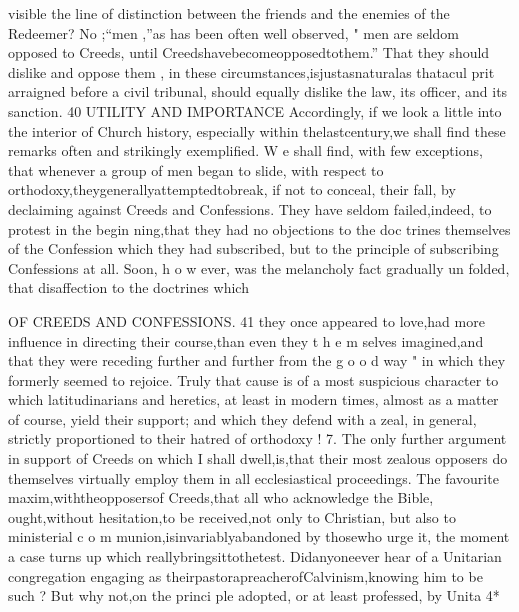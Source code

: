 \documentclass[
]{book}
\begin{document}
visible the line of distinction between the friends and the enemies of the Redeemer? No ;``men ,''as has been often well observed, " men are seldom opposed to Creeds, until Creedshavebecomeopposedtothem.'' That they should dislike and oppose them , in these
circumstances,isjustasnaturalas thatacul prit arraigned before a civil tribunal, should equally dislike the law, its officer, and its sanction.
40 UTILITY AND IMPORTANCE
Accordingly, if we look a little into the interior of Church history, especially within thelastcentury,we shall find these remarks
often and strikingly exemplified. W e shall find, with few exceptions, that whenever a group of men began to slide, with respect to orthodoxy,theygenerallyattemptedtobreak, if not to conceal, their fall, by declaiming against Creeds and Confessions. They have
seldom failed,indeed, to protest in the begin ning,that they had no objections to the doc trines themselves of the Confession which
they had subscribed, but to the principle of subscribing Confessions at all. Soon, h o w ever, was the melancholy fact gradually un folded, that disaffection to the doctrines which

OF CREEDS AND CONFESSIONS. 41
they once appeared to love,had more influence in directing their course,than even they t h e m selves imagined,and that they were receding further and further from the g o o d way " in
which they formerly seemed to rejoice. Truly that cause is of a most suspicious character to which latitudinarians and heretics, at least in modern times, almost as a matter of course, yield their support; and which they defend
with a zeal, in general, strictly proportioned to their hatred of orthodoxy !
7. The only further argument in support of
Creeds on which I shall dwell,is,that their
most zealous opposers do themselves virtually
employ them in all ecclesiastical proceedings. The favourite maxim,withtheopposersof
Creeds,that all who acknowledge the Bible, ought,without hesitation,to be received,not only to Christian, but also to ministerial c o m munion,isinvariablyabandoned by thosewho urge it, the moment a case turns up which reallybringsittothetest. Didanyoneever hear of a Unitarian congregation engaging as
theirpastorapreacherofCalvinism,knowing him to be such ? But why not,on the princi
ple adopted, or at least professed, by Unita
4*
\end{document}
